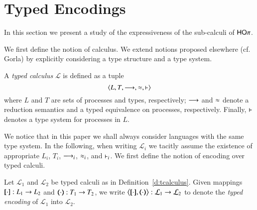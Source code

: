 \newcommand{\enc}[2]{\big\langle\map{#1}, \mapt{#2}\big\rangle}
\newcommand{\encod}[3]{\lrangle{\map{#1}^{#3}, \mapt{#2}^{#3}}}

\newcommand{\calc}[5]{\lrangle{#1, #2, #3, #4, #5}}
\newcommand{\tyl}[1]{\ensuremath{\mathcal{#1}}}

\section{Typed Encodings}

In this section we present a study of the expressiveness 
of the sub-calculi of $\mathsf{HO}\pi$.

We first define the notion of calculus. We extend notions proposed elsewhere (cf. Gorla) by explicitly
considering a type structure and a type system.

\begin{definition}\label{d:tcalculus}
	A \emph{typed calculus} $\tyl{L}$ is defined as a tuple $$\calc{L}{T}{\red}{\wb}{\proves}$$
	where $L$ and $T$ are sets of processes and types, respectively; %
	$\longrightarrow$ and $\approx$ denote a reduction semantics 
	and a typed equivalence
	 on processes, respectively. Finally, $\vdash$ denotes a type system for processes in $L$.
\end{definition}

We notice that in this paper we shall always consider languages with the same type system.
In the following, when writing $\tyl{L}_i$ we tacitly assume the existence of appropriate 
$L_i$, $T_i$, $\longrightarrow_i$, $\approx_i$, and $\vdash_i$.
We first define the notion of encoding over typed calculi.

\begin{definition}
	Let  $\tyl{L}_1$ %
	and $\tyl{L}_2$ %
	be typed calculi as in Definition~\ref{d:tcalculus}.
	Given mappings $[\!\![\cdot]\!\!]: L_1 \to L_2$ and
	$(\!\!\langle\cdot\rangle\!\!): T_1 \to T_2$, 
	we write 
	$\enc{\cdot}{\cdot} : \tyl{L}_1 \to \tyl{L}_2$ to denote the \emph{typed encoding} of $\tyl{L}_1$ into $\tyl{L}_2$.

\end{definition}

